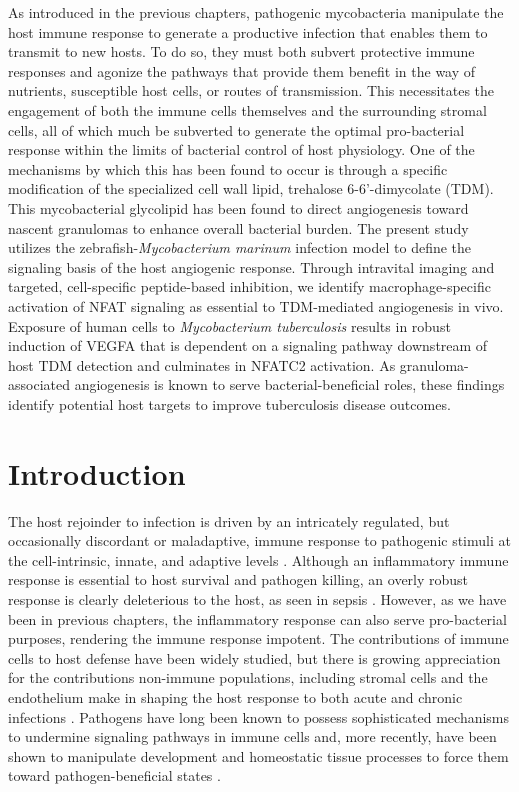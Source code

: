 As introduced in the previous chapters, pathogenic mycobacteria manipulate the host immune response to generate a productive infection that enables them to transmit to new hosts. To do so, they must both subvert protective immune responses and agonize the pathways that provide them benefit in the way of nutrients, susceptible host cells, or routes of transmission. This necessitates the engagement of both the immune cells themselves and the surrounding stromal cells, all of which much be subverted to generate the optimal pro\hyp{}bacterial response within the limits of bacterial control of host physiology. One of the mechanisms by which this has been found to occur is through a specific modification of the specialized cell wall lipid, trehalose 6\hyp{}6'\hyp{}dimycolate (TDM). This mycobacterial glycolipid has been found to direct angiogenesis toward nascent granulomas to enhance overall bacterial burden. The present study utilizes the zebrafish\hyp{}\textit{Mycobacterium marinum} infection model to define the signaling basis of the host angiogenic response. Through intravital imaging and targeted, cell\hyp{}specific peptide\hyp{}based inhibition, we identify macrophage\hyp{}specific activation of NFAT signaling as essential to TDM\hyp{}mediated angiogenesis in vivo.  Exposure of human cells to \textit{Mycobacterium tuberculosis} results in robust induction of VEGFA that is dependent on a signaling pathway downstream of host TDM detection and culminates in NFATC2 activation. As granuloma\hyp{}associated angiogenesis is known to serve bacterial\hyp{}beneficial roles, these findings identify potential host targets to improve tuberculosis disease outcomes.

\section{Introduction}\label{pap:intro}

The host rejoinder to infection is driven by an intricately regulated, but occasionally discordant or maladaptive, immune response to pathogenic stimuli at the cell\hyp{}intrinsic, innate, and adaptive levels \citep{Iwasaki2010, Finlay2006, Haldar2015, MacMicking2004, MacMicking2012, Kim2012}. Although an inflammatory immune response is essential to host survival and pathogen killing, an overly robust response is clearly deleterious to the host, as seen in sepsis \citep{Finethy2020, Casadevall2003}. However, as we have been in previous chapters, the inflammatory response can also serve pro\hyp{}bacterial purposes, rendering the immune response impotent. The contributions of immune cells to host defense have been widely studied, but there is growing appreciation for the contributions non\hyp{}immune populations, including stromal cells and the endothelium \citep{Honan2021, Worrell2021, Amersfoort2022, Honan2021} make in shaping the host response to both acute and chronic infections \citep{Mueller2009, Randow2013, Krishnamurty2020}. Pathogens have long been known to possess sophisticated mechanisms to undermine signaling pathways in immune cells and, more recently, have been shown to manipulate development and homeostatic tissue processes to force them toward pathogen\hyp{}beneficial states \citep{Menzies1998, Guichard2013}.

